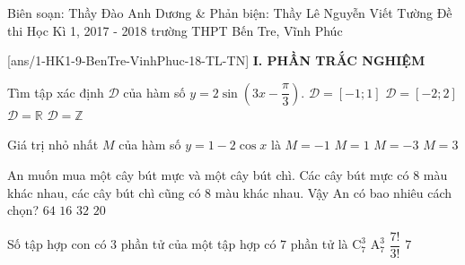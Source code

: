 	\begin{name}
{Biên soạn: Thầy Đào Anh Dương \& Phản biện: Thầy Lê Nguyễn Viết Tường}
		{Đề thi Học Kì 1, 2017 - 2018 trường THPT Bến Tre, Vĩnh Phúc}
	\end{name}
	\setcounter{ex}{0}\setcounter{bt}{0}
	[ans/1-HK1-9-BenTre-VinhPhuc-18-TL-TN]
\noindent\textbf{I. PHẦN TRẮC NGHIỆM}

\begin{ex}%
	Tìm tập xác định $\mathscr{D}$ của hàm số $y= 2\sin \left(3x-\dfrac{\pi}{3} \right)$. 
	\choice
	{$\mathscr{D}= [-1; 1]$}
	{$\mathscr{D}= [-2; 2]$}
	{\True $\mathscr{D}= \mathbb{R}$}
	{$\mathscr{D}= \mathbb{Z}$}
\end{ex}

\begin{ex}%
	Giá trị nhỏ nhất $M$ của hàm số $y= 1- 2\cos x$ là
	\choice
	{\True $M = -1$}
	{$M = 1$}
	{$M = -3$}
	{$M = 3$}
\end{ex}

\begin{ex}%
	An muốn mua một cây bút mực và một cây bút chì. Các cây bút mực có $8$ màu khác nhau, các cây bút chì cũng có $8$ màu khác nhau. Vậy An có bao nhiêu cách chọn?
	\choice
	{\True $64$}
	{$16$}
	{$32$}
	{$20$}
\end{ex}

\begin{ex}%
	Số tập hợp con có $3$ phần tử của một tập hợp có $7$ phần tử là
	\choice
	{\True $\mathrm{C}_7^3$}
	{$\mathrm{A}_7^3$}
	{$\dfrac{7!}{3!}$}
	{$7$}
\end{ex}

